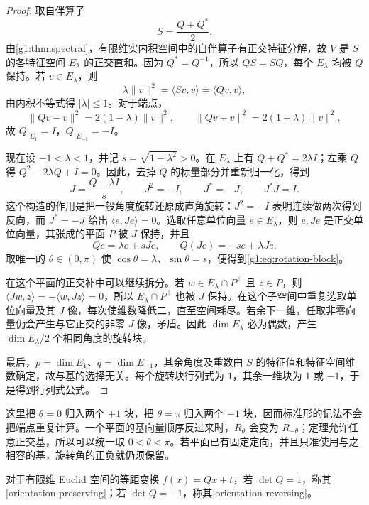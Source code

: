 \begin{proof}
	取自伴算子
	\[
		S=\frac{Q+Q^*}{2}.
	\]
	由\cref{g1:thm:spectral}，有限维实内积空间中的自伴算子有正交特征分解，故 \(V\) 是 \(S\) 的各特征空间 \(E_\lambda\) 的正交直和。因为 \(Q^*=Q^{-1}\)，所以 \(QS=SQ\)，每个 \(E_\lambda\) 均被 \(Q\) 保持。若 \(v\in E_\lambda\)，则
	\[
		\lambda\lVert v\rVert^2=\langle Sv,v\rangle
		=\langle Qv,v\rangle,
	\]
	由内积不等式得 \(|\lambda|\leq 1\)。对于端点，
	\[
		\lVert Qv-v\rVert^2=2(1-\lambda)\lVert v\rVert^2,
		\qquad
		\lVert Qv+v\rVert^2=2(1+\lambda)\lVert v\rVert^2,
	\]
	故 \(Q|_{E_1}=I\)，\(Q|_{E_{-1}}=-I\)。

	现在设 \(-1<\lambda<1\)，并记 \(s=\sqrt{1-\lambda^2}>0\)。在 \(E_\lambda\) 上有 \(Q+Q^*=2\lambda I\)；左乘 \(Q\) 得 \(Q^2-2\lambda Q+I=0\)。因此，去掉 \(Q\) 的标量部分并重新归一化，得到
	\[
		J=\frac{Q-\lambda I}{s},\qquad J^2=-I,
		\qquad J^*=-J,
		\qquad J^*J=I.
	\]
	这个构造的作用是把一般角度旋转还原成直角旋转：\(J^2=-I\) 表明连续做两次得到反向，而 \(J^*=-J\) 给出 \(\langle e,Je\rangle=0\)。选取任意单位向量 \(e\in E_\lambda\)，则 \(e,Je\) 是正交单位向量，其张成的平面 \(P\) 被 \(J\) 保持，并且
	\[
		Qe=\lambda e+sJe,\qquad Q(Je)=-se+\lambda Je.
	\]
	取唯一的 \(\theta\in(0,\pi)\) 使 \(\cos\theta=\lambda\)、\(\sin\theta=s\)，便得到\eqref{g1:eq:rotation-block}。

	在这个平面的正交补中可以继续拆分。若 \(w\in E_\lambda\cap P^\perp\) 且 \(z\in P\)，则 \(\langle Jw,z\rangle=-\langle w,Jz\rangle=0\)，所以 \(E_\lambda\cap P^\perp\) 也被 \(J\) 保持。在这个子空间中重复选取单位向量及其 \(J\) 像，每次使维数降低二，直至空间耗尽。若余下一维，任取非零向量仍会产生与它正交的非零 \(J\) 像，矛盾。因此 \(\dim E_\lambda\) 必为偶数，产生 \(\dim E_\lambda/2\) 个相同角度的旋转块。

	最后，\(p=\dim E_1\)、\(q=\dim E_{-1}\)，其余角度及重数由 \(S\) 的特征值和特征空间维数确定，故与基的选择无关。每个旋转块行列式为 \(1\)，其余一维块为 \(1\) 或 \(-1\)，于是得到行列式公式。
\end{proof}

这里把 \(\theta=0\) 归入两个 \(+1\) 块，把 \(\theta=\pi\) 归入两个 \(-1\) 块，因而标准形的记法不会把端点重复计算。一个平面的基向量顺序反过来时，\(R_\theta\) 会变为 \(R_{-\theta}\)；定理允许任意正交基，所以可以统一取 \(0<\theta<\pi\)。若平面已有固定定向，并且只准使用与之相容的基，旋转角的正负就仍须保留。

\begin{definition}
	\label{g1:def:direct-isometry}
	对于有限维 Euclid 空间的等距变换 \(f(x)=Qx+t\)，若 \(\det Q=1\)，称其[orientation-preserving]；若 \(\det Q=-1\)，称其[orientation-reversing]。
\end{definition}

